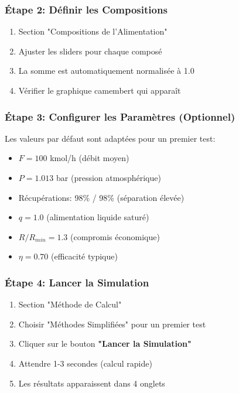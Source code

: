 \documentclass[11pt,a4paper]{article}
\begin{document}
\subsubsection{Étape 2: Définir les Compositions}

\begin{enumerate}[leftmargin=*]
    \item Section "Compositions de l'Alimentation"
    \item Ajuster les sliders pour chaque composé
    \item La somme est automatiquement normalisée à 1.0
    \item Vérifier le graphique camembert qui apparaît
\end{enumerate}

\subsubsection{Étape 3: Configurer les Paramètres (Optionnel)}

Les valeurs par défaut sont adaptées pour un premier test:

\begin{itemize}[leftmargin=*]
    \item $F = 100$ kmol/h (débit moyen)
    \item $P = 1.013$ bar (pression atmosphérique)
    \item Récupérations: 98\% / 98\% (séparation élevée)
    \item $q = 1.0$ (alimentation liquide saturé)
    \item $R/R_{min} = 1.3$ (compromis économique)
    \item $\eta = 0.70$ (efficacité typique)
\end{itemize}

\subsubsection{Étape 4: Lancer la Simulation}

\begin{enumerate}[leftmargin=*]
    \item Section "Méthode de Calcul"
    \item Choisir "Méthodes Simplifiées" pour un premier test
    \item Cliquer sur le bouton \textbf{"Lancer la Simulation"}
    \item Attendre 1-3 secondes (calcul rapide)
    \item Les résultats apparaissent dans 4 onglets
\end{enumerate}
\end{document}
